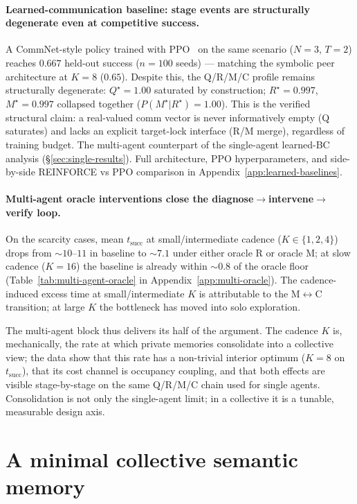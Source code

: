\documentclass{article}
\begin{document}
\paragraph{Learned-communication baseline: stage events are structurally degenerate even at competitive success.}
A CommNet-style policy \citep{sukhbaatar2016commnet} trained with PPO~\citep{schulman2017proximal} on the same scenario ($N{=}3$, $T{=}2$) reaches $0.667$ held-out success ($n{=}100$ seeds) --- matching the symbolic peer architecture at $K{=}8$ ($0.65$). Despite this, the Q/R/M/C profile remains structurally degenerate: $Q^\star{=}1.00$ saturated by construction; $R^\star{=}0.997$, $M^\star{=}0.997$ collapsed together ($P(M^\star|R^\star){=}1.00$). This is the verified structural claim: a real-valued comm vector is never informatively empty (Q saturates) and lacks an explicit target-lock interface (R/M merge), regardless of training budget. The multi-agent counterpart of the single-agent learned-BC analysis (\S\ref{sec:single-results}). Full architecture, PPO hyperparameters, and side-by-side REINFORCE vs PPO comparison in Appendix~\ref{app:learned-baselines}.

\paragraph{Multi-agent oracle interventions close the diagnose$\to$intervene$\to$verify loop.}
On the scarcity cases, mean $t_{\mathrm{succ}}$ at small/intermediate cadence ($K{\in}\{1,2,4\}$) drops from $\sim10$--$11$ in baseline to $\sim7.1$ under either oracle R or oracle M; at slow cadence ($K{=}16$) the baseline is already within $\sim0.8$ of the oracle floor (Table~\ref{tab:multi-agent-oracle} in Appendix~\ref{app:multi-oracle}). The cadence-induced excess time at small/intermediate $K$ is attributable to the M$\leftrightarrow$C transition; at large $K$ the bottleneck has moved into solo exploration.

The multi-agent block thus delivers its half of the argument. The
cadence $K$ is, mechanically, the rate at which private memories
consolidate into a collective view; the data show that this rate has a
non-trivial interior optimum ($K\!=\!8$ on $t_{\mathrm{succ}}$), that
its cost channel is occupancy coupling, and that both effects are
visible stage-by-stage on the same Q/R/M/C chain used for single
agents. Consolidation is not only the single-agent limit; in a
collective it is a tunable, measurable design axis.

\section{A minimal collective semantic memory}
\label{sec:csm}
\label{sec:synthesis}
\end{document}
